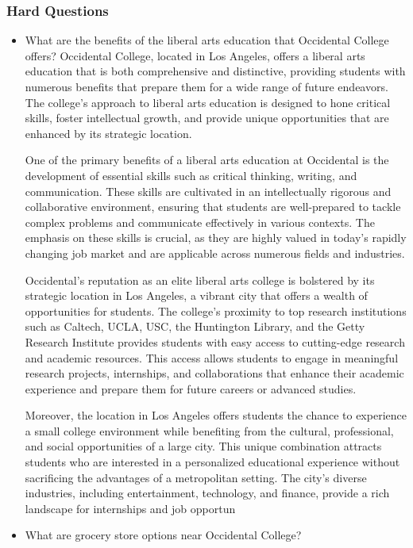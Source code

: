 \documentclass[10pt,twocolumn]{article}
\begin{document}
\subsubsection{Hard Questions}
\begin{itemize}
\item What are the benefits of the liberal arts education that Occidental College offers?
Occidental College, located in Los Angeles, offers a liberal arts education that is both comprehensive and distinctive, providing students with numerous benefits that prepare them for a wide range of future endeavors. The college's approach to liberal arts education is designed to hone critical skills, foster intellectual growth, and provide unique opportunities that are enhanced by its strategic location.

One of the primary benefits of a liberal arts education at Occidental is the development of essential skills such as critical thinking, writing, and communication. These skills are cultivated in an intellectually rigorous and collaborative environment, ensuring that students are well-prepared to tackle complex problems and communicate effectively in various contexts. The emphasis on these skills is crucial, as they are highly valued in today's rapidly changing job market and are applicable across numerous fields and industries.

Occidental's reputation as an elite liberal arts college is bolstered by its strategic location in Los Angeles, a vibrant city that offers a wealth of opportunities for students. The college's proximity to top research institutions such as Caltech, UCLA, USC, the Huntington Library, and the Getty Research Institute provides students with easy access to cutting-edge research and academic resources. This access allows students to engage in meaningful research projects, internships, and collaborations that enhance their academic experience and prepare them for future careers or advanced studies.

Moreover, the location in Los Angeles offers students the chance to experience a small college environment while benefiting from the cultural, professional, and social opportunities of a large city. This unique combination attracts students who are interested in a personalized educational experience without sacrificing the advantages of a metropolitan setting. The city's diverse industries, including entertainment, technology, and finance, provide a rich landscape for internships and job opportun

\item What are grocery store options near Occidental College?


\end{itemize}
\end{document}
